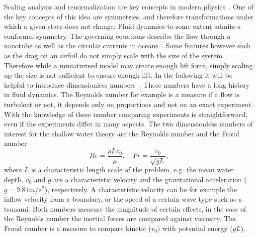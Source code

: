 Scaling analysis and renormalization are key concepts in modern physics~\cite{yakhotRenormalizationGroupAnalysis1986, IntroductionQuantumField2018}.
One of the key concepts of this idea are symmetries, and therefore transformations under which a given state does not change.
Fluid dynamics to some extent admits a conformal symmetry.
The governing equations describe the flow through a nanotube as well as the circular currents in oceans~\cite{secchiMassiveRadiusdependentFlow2016, marcheDerivationNewTwodimensional2007}.
Some features however such as the drag on an airfoil do not simply scale with the size of the system.
Therefore while a miniaturised model may create enough lift force, simply scaling up the size is not sufficient to ensure enough lift.  
In the following it will be helpful to introduce dimensionless numbers~\cite{ruzickaDimensionlessNumbers2008,neversFluidMechanicsChemical2019}.
These numbers have a long history in fluid dynamics.
The Reynolds number for example is a measure if a flow is turbulent or not, it depends only on proportions and not on an exact experiment.
With the knowledge of these number comparing experiments is straightforward, even if the experiments differ in many aspects.
The two dimensionless numbers of interest for the shallow water theory are the Reynolds number and the Froud number
\begin{equation}\label{eq:Re_and_Fr}
    Re = \frac{\rho L v_0}{\mu},\quad Fr = \frac{v_0}{\sqrt{g L}},
\end{equation}
where $L$ is a characteristic length scale of the problem, e.g. the mean water depth, $v_0$ and $g$ are a characteristic velocity and the gravitational acceleration ($g = 9.81 m/s^2$), respectively.
A characteristic velocity can be for example the inflow velocity from a boundary, or the speed of a certain wave type such as a tsunami.
Both numbers measure the magnitude of certain effects, in the case of the Reynolds number the inertial forces are compared against viscosity.
The Froud number is a measure to compare kinetic ($v_0$) with potential energy ($g L$).

